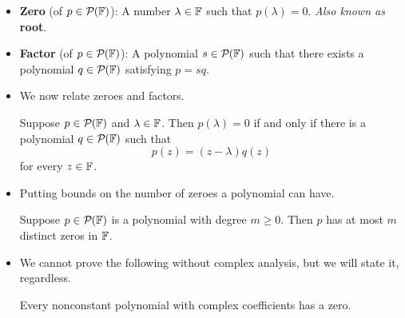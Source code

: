 \documentclass[../main.tex]{subfiles}
\begin{document}
\begin{itemize}
\begin{theorem}
\begin{proof}
            It follows by the \hyperref[trm:fundamentalTheoremLinearMaps]{Fundamental Theorem of Linear Maps} that
            \begin{align*}
                \dim\range T &= \dim(\pol[n-m]{\F}\times\pol[m-1]{\F})-\dim\nul T\\
                &= n+1\\
                &= \dim\pol[n]{\F}
            \end{align*}
            Thus, by Exercise \ref{exr:subspaceSameDim}, $\range T=\pol[n]{\F}$. Therefore, since $p\in\pol[n]{\F}$, we know that there exists $q\in\pol[n-m]{\F}$ and $r\in\pol[m-1]{\F}$ such that $p=T(q,r)=sq+r$.\par
            Additionally, we know that $q,r$ are unique: If there exist $q',r'$ such that $T(q',r')=p$, then $T(q-q',r-r')=p-p=0$, implying since $\nul T=\{(0,0)\}$ that $q-q'=0$ and $r-r'=0$, i.e., that $q=q'$ and $r=r'$.
        \end{proof}
    \end{theorem}
    \item \textbf{Zero} (of $p\in\mathcal{P}_{}(\mathbb{F})$): A number $\lambda\in\mathbb{F}$ such that $p(\lambda)=0$. \emph{Also known as} \textbf{root}.
    \item \textbf{Factor} (of $p\in\mathcal{P}_{}(\mathbb{F})$): A polynomial $s\in\mathcal{P}_{}(\mathbb{F})$ such that there exists a polynomial $q\in\mathcal{P}_{}(\mathbb{F})$ satisfying $p=sq$.
    \item We now relate zeroes and factors.
    \begin{theorem}\label{trm:polZeroFactor}
        Suppose $p\in\mathcal{P}_{}(\mathbb{F})$ and $\lambda\in\mathbb{F}$. Then $p(\lambda)=0$ if and only if there is a polynomial $q\in\mathcal{P}_{}(\mathbb{F})$ such that
        \begin{equation*}
            p(z) = (z-\lambda)q(z)
        \end{equation*}
        for every $z\in\mathbb{F}$.
    \end{theorem}
    \item Putting bounds on the number of zeroes a polynomial can have.
    \begin{theorem}
        Suppose $p\in\mathcal{P}_{}(\mathbb{F})$ is a polynomial with degree $m\geq 0$. Then $p$ has at most $m$ distinct zeros in $\mathbb{F}$.
    \end{theorem}
    \item We cannot prove the following without complex analysis, but we will state it, regardless.
    \begin{theorem}
        Every nonconstant polynomial with complex coefficients has a zero.

\end{theorem}
\end{itemize}
\end{document}
